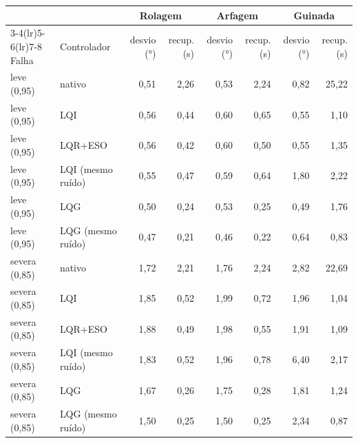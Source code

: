 \begin{tabular}{llrrrrrr}
\toprule
 & & \multicolumn{2}{c}{Rolagem} & \multicolumn{2}{c}{Arfagem} & \multicolumn{2}{c}{Guinada} \\
\cmidrule(lr){3-4}\cmidrule(lr){5-6}\cmidrule(lr){7-8}
Falha & Controlador & desvio (\si{\degree}) & recup. (\si{\second}) & desvio (\si{\degree}) & recup. (\si{\second}) & desvio (\si{\degree}) & recup. (\si{\second}) \\
\midrule
leve (0,95) & nativo & 0,51 & 2,26 & 0,53 & 2,24 & 0,82 & 25,22 \\
leve (0,95) & LQI & 0,56 & 0,44 & 0,60 & 0,65 & 0,55 & 1,10 \\
leve (0,95) & LQR+ESO & 0,56 & 0,42 & 0,60 & 0,50 & 0,55 & 1,35 \\
leve (0,95) & LQI (mesmo ruído) & 0,55 & 0,47 & 0,59 & 0,64 & 1,80 & 2,22 \\
leve (0,95) & LQG & 0,50 & 0,24 & 0,53 & 0,25 & 0,49 & 1,76 \\
leve (0,95) & LQG (mesmo ruído) & 0,47 & 0,21 & 0,46 & 0,22 & 0,64 & 0,83 \\
\addlinespace
severa (0,85) & nativo & 1,72 & 2,21 & 1,76 & 2,24 & 2,82 & 22,69 \\
severa (0,85) & LQI & 1,85 & 0,52 & 1,99 & 0,72 & 1,96 & 1,04 \\
severa (0,85) & LQR+ESO & 1,88 & 0,49 & 1,98 & 0,55 & 1,91 & 1,09 \\
severa (0,85) & LQI (mesmo ruído) & 1,83 & 0,52 & 1,96 & 0,78 & 6,40 & 2,17 \\
severa (0,85) & LQG & 1,67 & 0,26 & 1,75 & 0,28 & 1,81 & 1,24 \\
severa (0,85) & LQG (mesmo ruído) & 1,50 & 0,25 & 1,50 & 0,25 & 2,34 & 0,87 \\
\bottomrule
\end{tabular}
